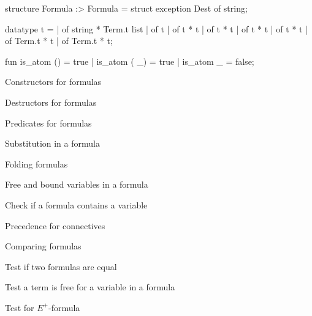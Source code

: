 \nwenddocs{}\endmoddef\nwstartdeflinemarkup\nwenddeflinemarkup
structure Formula :> Formula = struct
exception Dest of string;

datatype t = 
           |  of string * Term.t list
           |  of t
           |  of t * t
           |  of t * t
           |  of t * t
           |  of t * t
           |  of Term.t * t
           |  of Term.t * t;

fun is_atom () = true
  | is_atom ( _) = true
  | is_atom _ = false;

\LA{}Constructors for formulas~{\nwtagstyle{}}\RA{}

\LA{}Destructors for formulas~{\nwtagstyle{}}\RA{}

\LA{}Predicates for formulas~{\nwtagstyle{}}\RA{}

\LA{}Substitution in a formula~{\nwtagstyle{}}\RA{}

\LA{}Folding formulas~{\nwtagstyle{}}\RA{}

\LA{}Free and bound variables in a formula~{\nwtagstyle{}}\RA{}

\LA{}Check if a formula contains a variable~{\nwtagstyle{}}\RA{}

\LA{}Precedence for connectives~{\nwtagstyle{}}\RA{}

\LA{}Comparing formulas~{\nwtagstyle{}}\RA{}

\LA{}Test if two formulas are equal~{\nwtagstyle{}}\RA{}

\LA{}Test a term is free for a variable in a formula~{\nwtagstyle{}}\RA{}

\LA{}Test for $E^{+}$-formula~{\nwtagstyle{}}\RA{}

